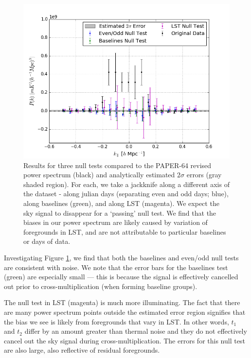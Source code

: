 \documentclass[preprint2,numberedappendix,tighten]{aastex6}  %
\begin{document}
\begin{figure}
	\centering
	\includegraphics[width=\columnwidth]{plots/null.png}
	\caption{Results for three null tests compared to the PAPER-64 revised power spectrum (black) and analytically estimated 
$2\sigma$ errors (gray shaded region). For each, we take a jackknife along a different axis of the dataset - along julian days (separating 
even and odd days; blue), along baselines (green), and along LST (magenta). We expect the sky signal to disappear for a `passing' null test. 
We find that the biases in our power spectrum are likely caused by variation of foregrounds in LST, and are not attributable to 
particular baselines or days of data.}
	\label{fig:null}
\end{figure}

Investigating Figure \ref{fig:null}, we find that both the baselines and even/odd null tests are consistent with noise. We note that 
the error bars for the baselines test (green) are especially small --- this is because the signal is effectively cancelled out prior to 
cross-multiplication (when forming baseline groups). 

The null test in LST (magenta) is much more illuminating. The fact that there are many power spectrum points outside the 
estimated error region signifies that the bias we see is likely from foregrounds that vary in LST. In other words, $t_{1}$ and 
$t_{2}$ differ by an amount greater than thermal noise and they do not effectively cancel out the sky signal during cross-multiplication. The errors for this null test are also large, also reflective of residual foregrounds. 
\end{document}
